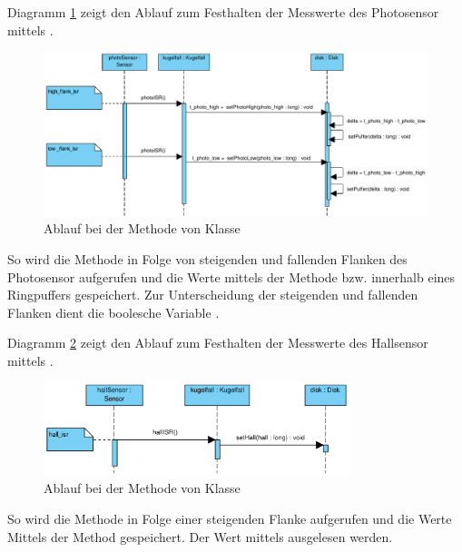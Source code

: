 Diagramm \ref{fig:photoISR} zeigt den Ablauf zum Festhalten der Messwerte des Photosensor mittels . 
\begin{figure}[htbp]
	\centering
	\includegraphics[width=\textwidth]{abb/photoISR_cropped}
	\caption{Ablauf bei der Methode  von Klasse }
	\label{fig:photoISR}
\end{figure}
So wird die  Methode  in Folge von steigenden und fallenden Flanken des Photosensor aufgerufen und die Werte mittels der Methode  bzw.  innerhalb eines Ringpuffers gespeichert.
Zur Unterscheidung der steigenden und fallenden Flanken dient die boolesche Variable .

Diagramm \ref{fig:hallISR} zeigt den Ablauf zum Festhalten der Messwerte des Hallsensor mittels .
\begin{figure}[htbp]
	\centering
	\includegraphics[width=0.8\textwidth]{abb/hallISR_cropped}
	\caption{Ablauf bei der Methode  von Klasse }
	\label{fig:hallISR}
\end{figure}
So wird die Methode  in Folge einer steigenden Flanke aufgerufen und die Werte Mittels der Method  gespeichert.
Der Wert mittels  ausgelesen werden.